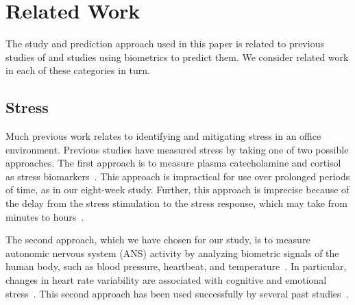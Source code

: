 \section{Related Work}


The study and prediction approach used in this paper is related
to previous studies of  and studies
using biometrics to predict them. We consider
related work in each of these categories in turn.



\subsection{Stress}
Much previous work relates to identifying and mitigating stress in an office environment.
Previous studies have measured stress by taking one of two possible approaches.
The first approach is to measure plasma catecholamine and cortisol as stress biomarkers~\cite{piazza10}.
This approach is impractical for use over prolonged periods of time, as in our eight-week study.
Further, this approach is imprecise because of the delay from the stress stimulation to the stress response, which 
may take from minutes to hours~\cite{Chandola10,Hellhammer09}.

The second approach, which we have chosen for our study, is to measure autonomic nervous system (ANS) activity by analyzing biometric signals of the human body, such as blood pressure, heartbeat, and temperature~\cite{kataoka00,Eekelen04,valentini10}.
In particular, changes in heart rate variability are associated with cognitive and emotional stress~\cite{mcduff16,dishman2000stress}.
This second approach has been used successfully by several past studies~\cite{Force96,gal07,montano09}.

